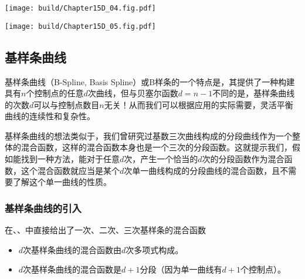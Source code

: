 \begin{Figure}[贝塞尔曲线的德卡斯特里奥算法图示]
    \begin{FigureSub}
        \texttt{[image: build/Chapter15D\_04.fig.pdf]}
    \end{FigureSub}\hspace{1cm}
    \begin{FigureSub}
        \texttt{[image: build/Chapter15D\_05.fig.pdf]}
    \end{FigureSub}
\end{Figure}

\subsection{基样条曲线}
基样条曲线（B-Spline, Basis Spline）或B样条的一个特点是，其提供了一种构建具有$n$个控制点的任意$d$次曲线，但与贝塞尔函数$d=n-1$不同的是，基样条曲线的次数$d$可以与控制点数目$n$无关！从而我们可以根据应用的实际需要，灵活平衡曲线的连续性和复杂性。

基样条曲线的想法类似于，我们曾研究过基数三次曲线构成的分段曲线作为一个整体的混合函数，这样的混合函数本身也是一个三次的分段函数。这就提示我们，假如能找到一种方法，能对于任意$d$次，产生一个恰当的$d$次的分段函数作为混合函数，这个混合函数就应当是某个$d$次单一曲线构成的分段曲线的混合函数，且不需要了解这个单一曲线的性质。


\subsubsection{基样条曲线的引入}
在、、中直接给出了一次、二次、三次基样条的混合函数
\begin{itemize}
    \item $d$次基样条曲线的混合函数由$d$次多项式构成。
    \item $d$次基样条曲线的混合函数是$d+1$分段（因为单一曲线有$d+1$个控制点）。
\end{itemize}

